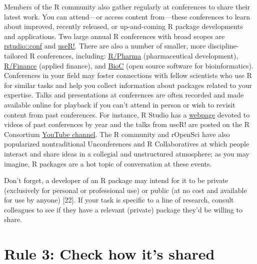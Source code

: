 \documentclass[10pt,letterpaper]{article}
\begin{document}
Members of the R community also gather regularly at conferences to share
their latest work. You can attend---or access content from---these
conferences to learn about improved, recently released, or up-and-coming
R package developments and applications. Two large annual R conferences
with broad scopes are
\href{https://rstudio.com/conference/}{rstudio::conf} and
\href{https://www.r-consortium.org/}{useR!}. There are also a number of
smaller, more discipline-tailored R conferences, including:
\href{https://rinpharma.com/}{R/Pharma} (pharmaceutical development),
\href{https://www.rinfinance.com/}{R/Finance} (applied finance), and
\href{https://www.bioconductor.org/help/events/}{BioC} (open source
software for bioinformatics). Conferences in your field may foster
connections with fellow scientists who use R for similar tasks and help
you collect information about packages related to your expertise. Talks
and presentations at conferences are often recorded and made available
online for playback if you can't attend in person or wish to revisit
content from past conferences. For instance, R Studio has a
\href{https://rstudio.com/resources/rstudioconf-2020/}{webpage} devoted
to videos of past conferences by year and the talks from useR! are
posted on the R Consortium
\href{https://www.youtube.com/channel/UC_R5smHVXRYGhZYDJsnXTwg/featured}{YouTube
channel}. The R community and rOpenSci have also popularized
nontraditional Unconferences and R Collaboratives at which people
interact and share ideas in a collegial and unstructured atmosphere; as
you may imagine, R packages are a hot topic of conversation at these
events.

Don't forget, a developer of an R package may intend for it to be
private (exclusively for personal or professional use) or public (at no
cost and available for use by anyone) {[}22{]}. If your task is specific
to a line of research, consult colleagues to see if they have a relevant
(private) package they'd be willing to share.

\hypertarget{rule-3-check-how-its-shared}{%
\section{Rule 3: Check how it's
shared}\label{rule-3-check-how-its-shared}}
\end{document}
